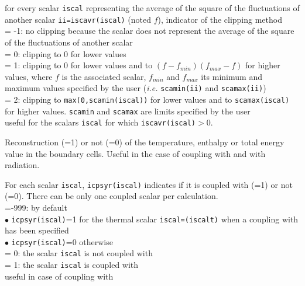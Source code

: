 {for every scalar {\tt iscal} representing the average of the square of the
fluctuations of another scalar {\tt ii=iscavr(iscal)} (noted $f$),
indicator of the clipping method\\
\hspace*{1.3cm}= -1: no clipping because the scalar does not represent
the average of the square of the fluctuations of another scalar\\
\hspace*{1.3cm}= 0: clipping to 0 for lower values\\
\hspace*{1.3cm}= 1: clipping to 0 for lower values and to
\mbox{$(f-f_{min})(f_{max}-f)$} for higher values, where $f$ is
the associated scalar, $f_{min}$ and $f_{max}$ its minimum and maximum
values specified by the user ({\em i.e.} {\tt scamin(ii)} and {\tt scamax(ii)}) \\
\hspace*{1.3cm}= 2: clipping to {\tt max(0,scamin(iscal))} for lower
values and to {\tt scamax(iscal)} for higher values. {\tt scamin} and {\tt scamax}
are limits specified by the user\\
useful for the scalars {\tt iscal} for which {\tt iscavr(iscal)}$>$0.}

{Reconstruction (=1) or not (=0) of the temperature, enthalpy or total energy
value in the boundary cells. Useful in the case of coupling with \syrthes
and with radiation.}

{For each scalar {\tt iscal}, {\tt icpsyr(iscal)} indicates if it is
coupled with \syrthes (=1) or not (=0).
There can be only one coupled scalar per calculation.\\
\hspace*{1.3cm}=-999: by default\\
\hspace*{2.cm} $\bullet$ {\tt icpsyr(iscal)}=1 for the thermal scalar
{\tt iscal=(iscalt)} when a coupling with \syrthes has been specified\\
\hspace*{2.cm} $\bullet$ {\tt icpsyr(iscal)}=0 otherwise\\
\hspace*{1.3cm}= 0: the scalar {\tt iscal} is not coupled with \syrthes\\
\hspace*{1.3cm}= 1: the scalar {\tt iscal} is coupled with \syrthes\\
useful in case of coupling with \syrthes}



